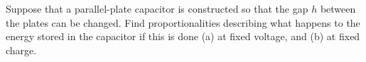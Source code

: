 Suppose that a parallel-plate capacitor is constructed so that the gap $h$ between the plates
can be changed. Find proportionalities describing what happens to the energy stored
in the capacitor if this is done (a) at fixed voltage, and (b) at fixed charge.
